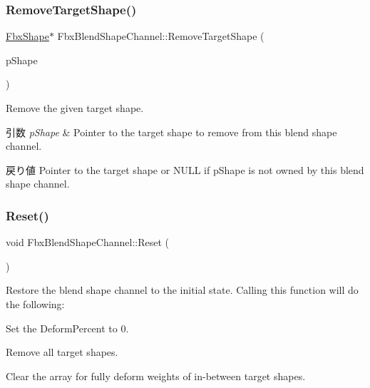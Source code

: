\subsubsection{\texorpdfstring{Remove\+Target\+Shape()}{RemoveTargetShape()}}
{\footnotesize\ttfamily \hyperlink{class_fbx_shape}{Fbx\+Shape}$\ast$ Fbx\+Blend\+Shape\+Channel\+::\+Remove\+Target\+Shape (\begin{DoxyParamCaption}\item[{\hyperlink{class_fbx_shape}{Fbx\+Shape} $\ast$}]{p\+Shape }\end{DoxyParamCaption})}

Remove the given target shape. 
\begin{DoxyParams}{引数}
{\em p\+Shape} & Pointer to the target shape to remove from this blend shape channel. \\
\hline
\end{DoxyParams}
\begin{DoxyReturn}{戻り値}
Pointer to the target shape or {\ttfamily N\+U\+LL} if p\+Shape is not owned by this blend shape channel. 
\end{DoxyReturn}
\mbox{\label{class_fbx_blend_shape_channel_a3b633999bdf324fe9ac96e297c572eba}} 
\subsubsection{\texorpdfstring{Reset()}{Reset()}}
{\footnotesize\ttfamily void Fbx\+Blend\+Shape\+Channel\+::\+Reset (\begin{DoxyParamCaption}{ }\end{DoxyParamCaption})}

Restore the blend shape channel to the initial state. Calling this function will do the following\+: \begin{DoxyItemize}
\item Set the Deform\+Percent to 0. \item Remove all target shapes. \item Clear the array for fully deform weights of in-\/between target shapes. \end{DoxyItemize}
\mbox{\label{class_fbx_blend_shape_channel_afa4cd576c24385c4ee10279a1deabc4d}} 

